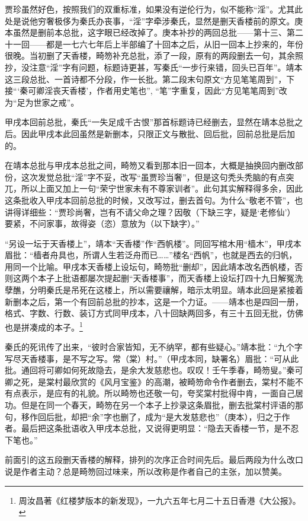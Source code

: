 \par 贾珍虽然好色，按照我们的双重标准，如果没有逆伦行为，似不能称“淫”。尤其此处是说他穷奢极侈为秦氏办丧事，“淫”字牵涉秦氏，显然是删天香楼前的原文。庚本虽然是删前本总批，这字眼已经改掉了。庚本补抄的两回总批——第十三、第二十一回——都是一七六七年后上半部编了十回本之后，从旧一回本上抄来的，年份很晚。当初删了天香楼，畸笏补充总批，添了一段，原有的两段删去一句，其余照抄，没注意“淫”字有问题，标题诗更甚，写秦氏“一步行来错，回头已百年”。靖本这三段总批、一首诗都不分段，作一长批。第二段末句原文“方见笔笔周到”，下接“‘秦可卿淫丧天香楼’，作者用史笔也”, “笔”字重复，因此“方见笔笔周到”改为“足为世家之戒”。
\par 甲戌本回前总批，秦氏“一失足成千古恨”那首标题诗已经删去，显然在靖本总批之后。因此甲戌本此回虽然是新删本，只限正文与散批、回后批，回前总批是后加的。
\par 在靖本总批与甲戌本总批之间，畸笏又看到那本旧一回本，大概是抽换回内删改部份，这次发觉总批“淫”字不妥，改写“虽贾珍当奢”，但是这句秃头秃脑的有点突兀，所以上面又加上一句“荣宁世家未有不尊家训者”。此句其实解释得多余，因此这条批收入甲戌本回前总批的时候，又改写过，删去首句。为什么“敬老不管”，也讲得详细些：“贾珍尚奢，岂有不请父命之理？因敬（下缺三字，疑是‘老修仙’）要紧，不问家事，故得姿（恣）意放为（以下缺字）。”
\par “另设一坛于天香楼上”，靖本“天香楼”作“西帆楼”。同回写棺木用“樯木”，甲戌本眉批：“樯者舟具也，所谓人生若泛舟而已……”楼名“西帆”，也就是西去的归帆，用同一个比喻。甲戌本天香楼上设坛句，畸笏批“删却”，因此靖本改名西帆楼，否则这两个本子上批语都屡次提起删“天香楼事”，而天香楼上设坛打四十九日解冤洗孽醮，分明秦氏是吊死在这楼上，所以需要禳解，暗示太明显。靖本此回是紧接着新删本之后，第一个有回前总批的抄本，这是一个力证。——靖本也是四回一册，格式、字数、行数、装订方式同甲戌本，八十回缺两回多，有三十五回无批，仿佛也是拼凑成的本子。\footnote{周汝昌著《红楼梦版本的新发现》，一九六五年七月二十五日香港《大公报》。}
\par 秦氏的死讯传了出来，“彼时合家皆知，无不纳罕，都有些疑心。”靖本批：“九个字写尽天香楼事，是不写之写。常（棠）村。”（甲戌本同，缺署名）眉批：“可从此批。通回将可卿如何死故隐去，是余大发慈悲也。叹叹！壬午季春，畸笏叟。”秦可卿之死，是棠村最欣赏的《风月宝鉴》的高潮，被畸笏命令作者删去，棠村不能不有点表示，是应有的礼貌。所以畸笏也还敬一句，夸奖棠村批得中肯，一面自己居功。但是在同一个春天，畸笏在另一个本子上抄录这条眉批，删去批棠村评语的那句，移作回后批，却把“余”字也删了，成为“是大发慈悲也”（庚本），归之于作者。最后把这条批语收入甲戌本总批，又说得更明显：“隐去天香楼一节，是不忍下笔也。”
\par 前面引的这五段删天香楼的解释，排列的次序正合时间先后。最后两段为什么改口说是作者主动？总是畸笏回过味来，所以改称是作者自己的主张，加以赞美。
